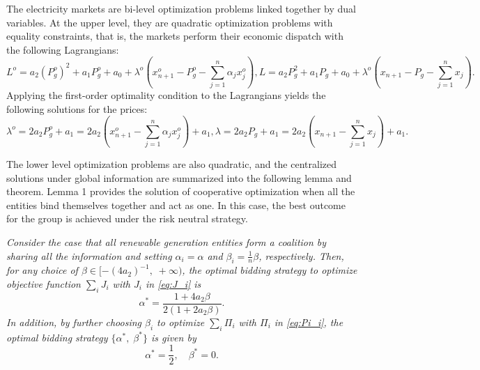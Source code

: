 \documentclass[conference]{IEEEtran}
\begin{document}
The electricity markets are bi-level optimization problems linked together by dual variables. At the upper level, they are quadratic optimization problems with equality constraints, that is, the markets perform their economic dispatch with the following Lagrangians: 
\begin{subequations}
\begin{equation} 
L^o = a_2(P_g^o)^2+a_1P_g^o+a_0 + \lambda^o\left(x_{n+1}^o- P_g^o-\sum_{j=1}^n \alpha_j x_j^o \right), \label{eq:L*}
\end{equation}
\begin{equation} 
L = a_2P_g^2+a_1P_g+a_0 + \lambda^o\left(x_{n+1}-P_g-\sum_{j=1}^n x_j\right). \label{eq:L}
\end{equation}
\end{subequations}
Applying the first-order optimality condition to the Lagrangians yields the following solutions for the prices:
\begin{subequations}
\begin{equation} 
\lambda^o = 2a_2P_g^o +a_1 = 2a_2\left(x_{n+1}^o-\sum_{j=1}^n \alpha_j x_j^o \right) +a_1 , \label{eq:lambda*}
\end{equation}
\begin{equation} 
\lambda = 2a_2P_g+a_1=2a_2\left(x_{n+1}-\sum_{j=1}^n x_j \right) + a_1. \label{eq:lambda}
\end{equation}
\end{subequations}

The lower level optimization problems are also quadratic, and the centralized solutions under global information are summarized into the following lemma and theorem. Lemma 1 provides the solution of cooperative optimization when all the entities bind themselves together and act as one. In this case, the best outcome for the group is achieved under the risk neutral strategy.

 {\it Consider the case that all renewable generation entities form a coalition by sharing all the information and setting $\alpha_i=\alpha$ and $\beta_i=\frac{1}{n}\beta$, respectively. Then, for any choice of $\beta\in[-(4a_2)^{-1},\; +\infty)$, the optimal bidding strategy to optimize objective function $\sum_i J_i$ with $J_i$ in \eqref{eq:J_i} is
\begin{equation}
\alpha^* = \frac{1 + 4a_2 \beta}{2(1 + 2a_2\beta)}.
\label{eq:alpha_1}
\end{equation}
In addition, by further choosing $\beta_i$ to optimize $\sum_i \Pi_i$ with $\Pi_i$ in \eqref{eq:Pi_i}, the optimal bidding strategy $\{\alpha^*, \; \beta^*\}$ is given by}
\begin{equation}
\alpha^*  =  \frac{1}{2}, \quad
\beta^*  =  0.
\label{eq:optimal_1}
\end{equation}
\end{document}
